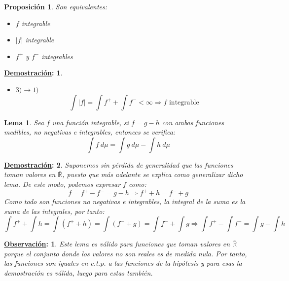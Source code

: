 \documentclass[10pt,a4paper,openright]{book}
\theoremstyle{break}
\newtheorem*{lema}{Lema}
\newtheorem*{prop}{Proposición}
\newtheorem*{demo}{\underline{Demostración}:}
\newtheorem*{obs}{\underline{Observación}:}
\newcommand{\dif}[1]{\ d#1}
\begin{document}
\begin{prop}
Son equivalentes:
\begin{itemize}
\item $f$ integrable
\item $|f|$ integrable
\item $f^+$ y $f^-$ integrables
\end{itemize}
\end{prop}
\begin{demo}
\begin{itemize}
\item $3)\rightarrow 1)$
$$\int |f| = \int f^+ + \int f^- < \infty \Rightarrow f \mbox{ integrable}$$
\end{itemize}
\end{demo}

\begin{lema}
Sea $f$ una función integrable, si $f = g - h$ con ambas funciones medibles, no negativas e integrables, entonces se verifica:
$$\int f \dif{\mu}= \int g \dif{\mu} - \int h \dif{\mu}$$
\end{lema}
\begin{demo}
Suponemos sin pérdida de generalidad que las funciones toman valores en $\bar{\mathbb{R}}$, puesto que más adelante se explica como generalizar dicho lema. De este modo, podemos expresar $f$ como:
$$f = f^+ - f^- = g-h\Rightarrow f^+ + h = f^- + g$$
Como todo son funciones no negativas e integrables, la integral de la suma es la suma de las integrales, por tanto:
$$\int f^+ + \int h = \int (f^+ + h) = \int (f^- + g)  = \int f^- + \int g \Rightarrow \int f^+ - \int f^- = \int g - \int h$$
\end{demo}

\begin{obs}
Este lema es válido para funciones que toman valores en $\bar{\mathbb{R}}$ porque el conjunto donde los valores no son reales es de medida nula. Por tanto, las funciones son iguales en c.t.p. a las funciones de la hipótesis y para esas la demostración es válida, luego para estas también.
\end{obs}
\end{document}
